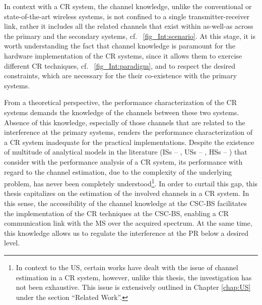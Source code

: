 In context with a CR system, the channel knowledge, unlike the conventional or state-of-the-art wireless systems, is not confined to a single transmitter-receiver link, rather it includes all the related channels that exist within as-well-as across the primary and the secondary systems, cf. \figurename~\ref{fig_Int:scenario}. At this stage, it is worth understanding the fact that channel knowledge is paramount for the hardware implementation of the CR systems, since it allows them to exercise different CR techniques, cf. \figurename~\ref{fig_Int:paradigm}, and to respect the desired constraints, which are necessary for the their co-existence with the primary systems. 

From a theoretical perspective, the performance characterization of the CR systems demands the knowledge of the channels between these two systems. Absence of this knowledge, especially of those channels that are related to the interference at the primary systems, renders the performance characterization of a CR system inadequate for the practical implementations. Despite the existence of multitude of analytical models in the literature (ISs -- \cite{Liang08, Sharma14, Pradhan15}, USs -- \cite{Xing07, Ghasemi07, Kang09}, HSs -- \cite{Song13, Gmira15, Jiang13, Fili15}) that consider with the performance analysis of a CR system, its performance with regard to the channel estimation, due to the complexity of the underlying problem, has never been completely understood\footnote{In context to the US, certain works \cite{Musa09, Suraweera10, Kim12} have dealt with the issue of channel estimation in a CR system, however, unlike this thesis, the investigation has not been exhaustive. This issue is extensively outlined in Chapter \ref{chap:US} under the section ``Related Work''.}. In order to curtail this gap, this thesis capitalizes on the estimation of the involved channels in a CR system. In this sense, the accessibility of the channel knowledge at the CSC-BS facilitates the implementation of the CR techniques at the CSC-BS, enabling a CR communication link with the MS over the acquired spectrum. At the same time, this knowledge allows us to regulate the interference at the PR below a desired level. 

